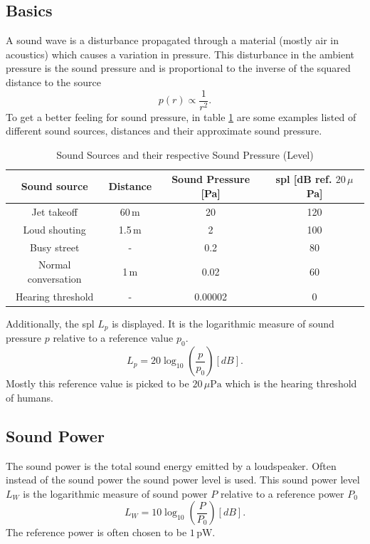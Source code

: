 \subsection{Basics}
A sound wave is a disturbance propagated through  a material (mostly air in acoustics) which causes a variation in pressure.
This disturbance in the ambient pressure is the sound pressure and is proportional to the inverse of the squared distance to the source \cite{BERANEK20121}
\begin{equation}\label{2_Acoustics_eq:Pressure_sphere}
    p(r) \propto \frac{1}{r^2}.
\end{equation}
To get a better feeling for sound pressure, in table \ref{2_Acoustics_tab:Sound_pressure_level} are some examples listed of different sound sources, distances and their approximate sound pressure. \cite{rossing1990science}
\begin{center}
\begin{table}[h!]
    \centering
    \begin{tabular}{| c | c | c | c |} 
     \hline 
     Sound source & Distance & Sound Pressure [Pa] & \acrshort{spl} [dB ref. $20 \, \mu$Pa] \\ 
     \hline
     Jet takeoff & 60$\,$m & 20 & 120 \\  
     Loud shouting & 1.5$\,$m & 2 & 100 \\
     Busy street & - & 0.2 & 80 \\
     Normal conversation & 1$\,$m & 0.02 & 60 \\
     Hearing threshold & - & 0.00002 & 0 \\
      \hline
    \end{tabular}
    \caption{Sound Sources and their respective Sound Pressure (Level)}
    \label{2_Acoustics_tab:Sound_pressure_level}
\end{table}
\end{center}
Additionally, the \acrfull{spl} $L_p$ is displayed. It is the logarithmic measure of sound pressure $p$ relative to a reference value $p_0$.
\begin{equation}
    L_p 
    =
    20 \log_{10} \left ( \frac{p}{p_0} \right ) [dB].
\end{equation}
Mostly this reference value is picked to be $20 \, \mu\text{Pa}$ which is the hearing threshold of humans. \cite{rossing1990science}
\subsection{Sound Power}
The sound power is the total sound energy emitted by a loudspeaker. Often instead of the sound power the sound power level is used. This sound power level $L_W$ is the logarithmic measure of sound power $P$ relative to a reference power $P_0$
\begin{equation}
    L_W = 10\log_{10} \left (  \frac{P}{P_0} \right ) [dB].
\end{equation}
The reference power is often chosen to be $1 \, \text{pW}$. \cite{rossing1990science}
